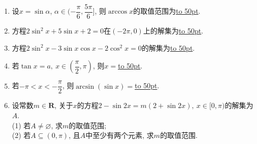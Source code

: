 \documentclass[10pt,a4paper]{article}
\newcommand{\blank}[1]{\underline{\hbox to #1pt{}}}
\begin{document}
\begin{enumerate}[1.]
\item 设$x=\sin\alpha$, $\alpha\in (-\dfrac{\pi}6,\dfrac{5\pi}6]$, 则$\arccos x$的取值范围为\blank{50}.
\item 方程$2\sin^2 x+5\sin x+2=0$在$(-2\pi,0)$上的解集为\blank{50}.
\item 方程$2\sin^2 x-3\sin x\cos x-2\cos^2 x=0$的解集为\blank{50}.
\item 若$\tan x=a, \ x\in (\dfrac{\pi}2,\pi)$, 则$x=$\blank{50}.
\item 若$-\pi<x<-\dfrac{\pi}2$, 则$\arcsin(\sin x)=$\blank{50}.
\item 设常数$m\in \mathbf{R}$, 关于$x$的方程$2-\sin 2x=m(2+\sin 2x), \ x\in [0,\pi)$的解集为$A$.\\
(1) 若$A\ne \varnothing$, 求$m$的取值范围;\\
(2) 若$A\subseteq (0,\pi)$, 且$A$中至少有两个元素, 求$m$的取值范围.


\end{enumerate}
\end{document}

